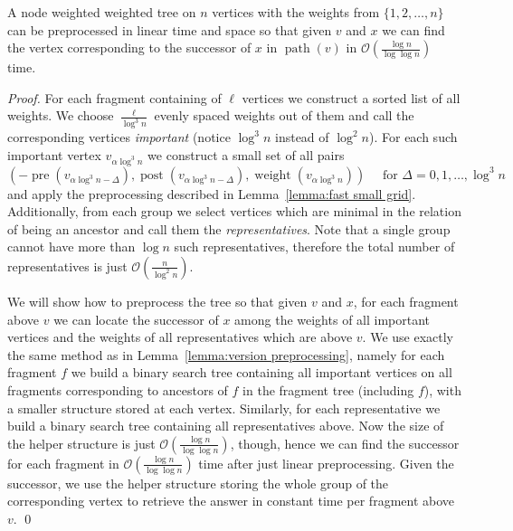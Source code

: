 \documentclass[runningheads]{llncs}
\DeclareMathOperator{\post}{post}
\DeclareMathOperator{\pre}{pre}
\DeclareMathOperator{\ancestors}{path}
\DeclareMathOperator{\weight}{weight}
\begin{document}
\begin{lemma}\label{lemma:fast version preprocessing}
A node weighted weighted tree on $n$ vertices with the weights from $\{1,2,\ldots,n\}$ can be preprocessed in linear time and space so that given $v$ and $x$ we can find the vertex corresponding to the successor of $x$ in $\ancestors(v)$ in $\mathcal{O}(\frac{\log n}{\log\log n})$ time.
\end{lemma}

\begin{proof}
For each fragment containing of $\ell$ vertices we construct a sorted list of all weights. We choose $\frac{\ell}{\log^{3}n}$ evenly spaced weights out of them and call the corresponding vertices {\it important} (notice $\log^{3}n$ instead of $\log^{2}n$). For each such important vertex $v_{\alpha\log^{3}n}$ we construct a small set of all pairs
$$\left(-\pre(v_{\alpha\log^{3}n-\Delta}),\post(v_{\alpha\log^{3}n-\Delta}),\weight(v_{\alpha\log^{3}n})\right) \quad\text{ for } \Delta=0,1,\dots,\log^{3}n$$
and apply the preprocessing described in Lemma~\ref{lemma:fast small grid}. Additionally, from each group we select vertices which are minimal in the relation of being an ancestor and call them the {\it representatives}. Note that a single group cannot have more than $\log n$ such representatives, therefore the total number of representatives is just $\mathcal{O}(\frac{n}{\log^{2}n})$.

We will show how to preprocess the tree so that given $v$ and $x$, for each fragment above $v$ we can locate the successor of $x$ among the weights of all important vertices and the weights of all representatives which are above $v$.  We use exactly the same method as in Lemma~\ref{lemma:version preprocessing}, namely for each fragment $f$ we build a binary search tree containing all important vertices on all fragments corresponding to ancestors of $f$ in the fragment tree (including $f$), with a smaller structure stored at each vertex. Similarly, for each representative we build a binary search tree containing all representatives above. Now the size of the helper structure is just $\mathcal{O}(\frac{\log n}{\log\log n})$, though,  hence we can find the successor for each fragment in $\mathcal{O}(\frac{\log n}{\log\log n})$ time after just linear preprocessing. Given the successor, we use the helper structure storing the whole group of the corresponding vertex to retrieve the answer in constant time per fragment above $v$.
\qed
\end{proof}
\end{document}
